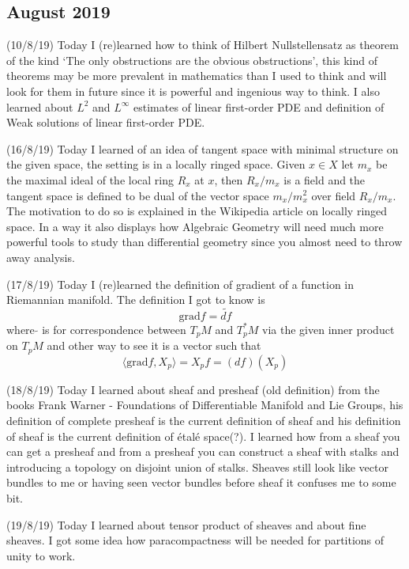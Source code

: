 \documentclass[12pt,a4paper]{article}
\begin{document}
\subsection*{August 2019}

\quad (10/8/19) Today I (re)learned how to think of Hilbert Nullstellensatz as theorem of the kind `The only obstructions are the obvious obstructions', this kind of theorems may be more prevalent in mathematics than I used to think and will look for them in future since it is powerful and ingenious way to think. I also learned about $L^2$ and $L^{\infty}$ estimates of linear first-order PDE and definition of Weak solutions of linear first-order PDE.

(16/8/19) Today I learned of an idea of tangent space with minimal structure on the given space, the setting is in a locally ringed space. Given $x\in X$ let $m_x$ be the maximal ideal of the local ring $R_x$ at $x$, then $R_x/m_x$ is a field and the tangent space is defined to be dual of the vector space $m_x/m_x^2$ over field $R_x/m_x$. The motivation to do so is explained in the Wikipedia article on locally ringed space. In a way it also displays how Algebraic Geometry will need much more powerful tools to study than differential geometry since you almost need to throw away analysis.

(17/8/19) Today I (re)learned the definition of gradient of a function in Riemannian manifold. The definition I got to know is $$\text{grad} f = \tilde{df}$$ where $\tilde{}$  is for correspondence between $T_pM$ and $T^*_pM$ via the given inner product on $T_pM$ and other way to see it is a vector such that 
$$\langle \text{grad}f, X_p \rangle = X_pf = (df)(X_p)$$

(18/8/19) Today I learned about sheaf and presheaf (old definition) from the books Frank Warner - Foundations of Differentiable Manifold and Lie Groups, his definition of complete presheaf is the current definition of sheaf and his definition of sheaf is the current definition of \'{e}tal\'{e} space(?). I learned how from a sheaf you can get a presheaf and from a presheaf you can construct a sheaf with stalks and introducing a topology on disjoint union of stalks. Sheaves still look like vector bundles to me or having seen vector bundles before sheaf it confuses me to some bit.

(19/8/19) Today I learned about tensor product of sheaves and about fine sheaves. I got some idea how paracompactness will be needed for partitions of unity to work.
\end{document}
